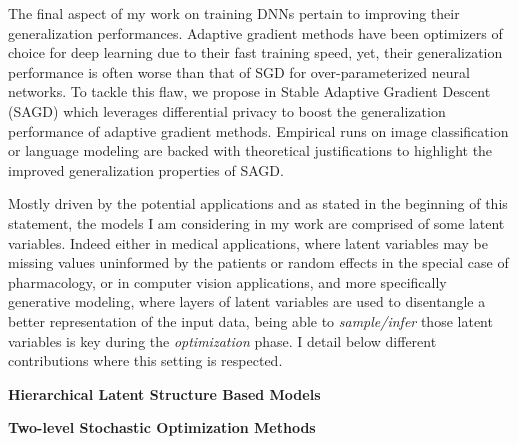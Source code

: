 \documentclass[twoside,11pt]{article}
\begin{document}
The final aspect of my work on training DNNs pertain to improving their generalization performances.
Adaptive gradient methods have been optimizers of choice for deep learning due to their fast training speed, yet, their generalization performance is often worse than that of SGD for over-parameterized neural networks. 
To tackle this flaw, we propose in \citep{zhou2020towards} Stable Adaptive Gradient Descent (\textsc{SAGD}) which leverages differential privacy to boost the generalization performance of adaptive gradient methods.
Empirical runs on image classification or language modeling are backed with theoretical justifications to highlight the improved generalization properties of \textsc{SAGD}.



\vspace{0.2in}
\textbf{}
\vspace{0.2in}

Mostly driven by the potential applications and as stated in the beginning of this statement, the models I am considering in my work are comprised of some latent variables.
Indeed either in medical applications, where latent variables may be missing values uninformed by the patients or random effects in the special case of pharmacology, or in computer vision applications, and more specifically generative modeling, where layers of latent variables are used to disentangle a better representation of the input data, being able to \emph{sample/infer} those latent variables is key during the \emph{optimization} phase.
I detail below different contributions where this setting is respected.

\vspace{0.15in}
\textbf{Hierarchical Latent Structure Based Models} 
\vspace{0.08in}


\citep{karimi2019global}
\citep{ren2020vfg}
\citep{karimi2020hwa} 


\lipsum[35]


\vspace{0.15in}
\textbf{Two-level Stochastic Optimization Methods} 
\vspace{0.08in}

\citep{karimi2019convergence}
\citep{karimi2020misso} 
\citep{karimi2020tts}
\end{document}
